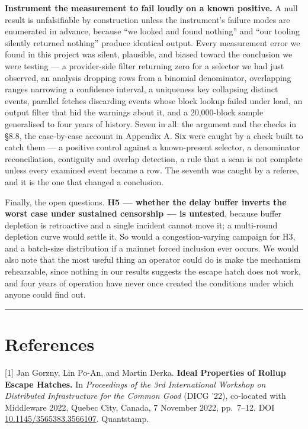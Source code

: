 \documentclass[conference]{IEEEtran}
\renewcommand{\_}{\textunderscore\allowbreak}
\begin{document}
\textbf{Instrument the measurement to fail loudly on a known positive.}
A null result is unfalsifiable by construction unless the instrument's
failure modes are enumerated in advance, because ``we looked and found
nothing'' and ``our tooling silently returned nothing'' produce
identical output. Every measurement error we found in this project was
silent, plausible, and biased toward the conclusion we were testing ---
a provider-side filter returning zero for a selector we had just
observed, an analysis dropping rows from a binomial denominator,
overlapping ranges narrowing a confidence interval, a uniqueness key
collapsing distinct events, parallel fetches discarding events whose
block lookup failed under load, an output filter that hid the warnings
about it, and a 20,000-block sample generalised to four years of
history. Seven in all: the argument and the checks in §8.8, the
case-by-case account in Appendix A. Six were caught by a check built to
catch them --- a positive control against a known-present selector, a
denominator reconciliation, contiguity and overlap detection, a rule
that a scan is not complete unless every examined event became a row.
The seventh was caught by a referee, and it is the one that changed a
conclusion.

Finally, the open questions. \textbf{H5 --- whether the delay buffer
inverts the worst case under sustained censorship --- is untested},
because buffer depletion is retroactive and a single incident cannot
move it; a multi-round depletion curve would settle it. So would a
congestion-varying campaign for H3, and a batch-size distribution if a
mainnet forced inclusion ever occurs. We would also note that the most
useful thing an operator could do is make the mechanism rehearsable,
since nothing in our results suggests the escape hatch does not work,
and four years of operation have never once created the conditions under
which anyone could find out.

\begin{center}\rule{0.5\linewidth}{0.5pt}\end{center}

\section{References}\label{references}

{[}1{]} Jan Gorzny, Lin Po-An, and Martin Derka. \textbf{Ideal
Properties of Rollup Escape Hatches.} In \emph{Proceedings of the 3rd
International Workshop on Distributed Infrastructure for the Common
Good} (DICG '22), co-located with Middleware 2022, Quebec City, Canada,
7 November 2022, pp.~7--12. DOI
\href{https://doi.org/10.1145/3565383.3566107}{10.1145/3565383.3566107}.
Quantstamp.
\end{document}
